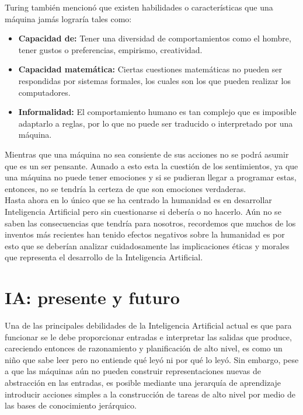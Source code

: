 \documentclass[12pt]{article}
\begin{document}
Turing también mencionó que existen habilidades o características que una máquina jamás lograría tales como:
\begin{itemize}
    \item \textbf{Capacidad de:} Tener una diversidad de comportamientos como el hombre, tener gustos o preferencias, empirismo, creatividad.
    \item \textbf{Capacidad matemática:} Ciertas cuestiones matemáticas no pueden ser respondidas por sistemas formales, los cuales son los que pueden realizar los computadores.
    \item \textbf{Informalidad:} El comportamiento humano es tan complejo que es imposible adaptarlo a reglas, por lo que no puede ser traducido o interpretado por una máquina.
\end{itemize}

Mientras que una máquina no sea consiente de sus acciones no se podrá asumir que es un ser pensante. Aunado a esto esta la cuestión de los sentimientos, ya que una máquina no puede tener emociones y si se pudieran llegar a programar estas, entonces, no se tendría la certeza de que son emociones verdaderas.\\

Hasta ahora en lo único que se ha centrado la humanidad es en desarrollar Inteligencia Artificial pero sin cuestionarse si debería o no hacerlo. Aún no se saben las consecuencias que tendría para nosotros, recordemos que muchos de los inventos más recientes han tenido efectos negativos sobre la humanidad es por esto que se deberían analizar cuidadosamente las implicaciones éticas y morales que representa el desarrollo de la Inteligencia Artificial. 

\section{IA: presente y futuro}

Una de las principales debilidades de la Inteligencia Artificial actual es que para funcionar se le debe proporcionar entradas e interpretar las salidas que produce, careciendo entonces de razonamiento y planificación de alto nivel, es como un niño que sabe leer pero no entiende qué leyó ni por qué lo leyó.
Sin embargo, pese a que las máquinas aún no pueden construir representaciones nuevas de abstracción en las entradas, es posible mediante una jerarquía de aprendizaje introducir acciones simples a la construcción de tareas de alto nivel por medio de las bases de conocimiento jerárquico.\\
\end{document}
